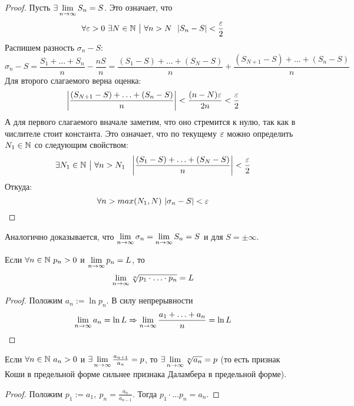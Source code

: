 \begin{proof}
	Пусть $\exists \lim\limits_{n \to \infty} S_n = S$. Это означает, что
	\[
		\forall \varepsilon > 0\ \exists N \in \mathbb{N} \ \big|\  \forall n > N\ \ |S_n - S| < \frac{\varepsilon}{2}
	\]
	Распишем разность $\sigma_n - S$:
	\[
		\sigma_n - S = \frac{S_1 + \ldots + S_n}{n} - \frac{nS}{n} = \frac{(S_1 - S) + \ldots + (S_N - S)}{n} + \frac{(S_{N + 1} - S) + \ldots + (S_n - S)}{n}
	\]
	Для второго слагаемого верна оценка:
	\[
		\left|\frac{(S_{N + 1} - S) + \ldots + (S_n - S)}{n}\right| < \frac{(n - N)\varepsilon}{2n} < \frac{\varepsilon}{2}
	\]
	А для первого слагаемого вначале заметим, что оно стремится к нулю, так как в числителе стоит константа. Это означает, что по текущему $\varepsilon$ можно определить $N_1 \in \mathbb{N}$ со следующим свойством:
	\[
		\exists N_1 \in \N \such \forall n > N_1\ \ \left|\frac{(S_1 - S) + \ldots + (S_N - S)}{n}\right| < \frac{\eps}{2}
	\]
	Откуда:
	\[
		\forall n > max(N_1, N)\ |\sigma_n - S| < \varepsilon
	\]
\end{proof}

\begin{note}
	Аналогично доказывается, что $\lim\limits_{n \to \infty} \sigma_n = \lim\limits_{n \to \infty} S_n = S$ и для $S = \pm \infty$.
\end{note}

\begin{corollary}
	Если $\forall n \in \mathbb{N}\ p_n > 0$ и $\lim\limits_{n \to \infty} p_n = L$, то
	\[
		\lim\limits_{n \to \infty} \sqrt[n]{p_1 \cdot \ldots \cdot p_n} = L
	\]
\end{corollary}

\begin{proof}
	Положим $a_n := \ln p_n$. В силу непрерывности
	\[
		\lim\limits_{n \to \infty} a_n = \ln L \Rightarrow \lim\limits_{n \to \infty} \frac{a_1 + \ldots + a_n}{n} = \ln L
	\]
\end{proof}

\begin{corollary}
	Если $\forall n \in \mathbb{N}\ a_n > 0$ и $\exists \lim\limits_{n \to \infty} \frac{a_{n + 1}}{a_n} = p$, то $\exists \lim\limits_{n \to \infty} \sqrt[n]{a_n} = p$ (то есть признак Коши в предельной форме сильнее признака Даламбера в предельной форме).
\end{corollary}

\begin{proof}
	Положим $p_1 := a_1,\ p_n = \frac{a_n}{a_{n - 1}}$. Тогда $p_1 \cdot \ldots p_n = a_n$.
\end{proof}